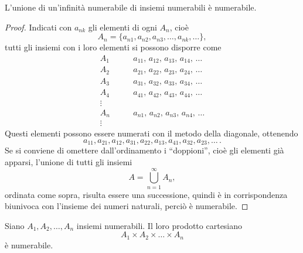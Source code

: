 \begin{teorema}
\label{t:unione_num}
L'unione di un'infinità numerabile di insiemi numerabili è numerabile.
\end{teorema}
\begin{proof}
Indicati con $a_{nk}$ gli elementi di ogni $A_n$, cioè
\[
A_n=\{a_{n1},a_{n2},a_{n3},\dots,a_{nk},\dots\},
\]
tutti gli insiemi con i loro elementi si possono disporre come
\begin{align*}
A_1\qquad &a_{11},\,a_{12},\,a_{13},\,a_{14},\,\dots\\
A_2\qquad &a_{21},\,a_{22},\,a_{23},\,a_{24},\,\dots\\
A_3\qquad &a_{31},\,a_{32},\,a_{33},\,a_{34},\,\dots\\
A_4\qquad &a_{41},\,a_{42},\,a_{43},\,a_{44},\,\dots\\
\vdots\\
A_n\qquad &a_{n1},\,a_{n2},\,a_{n3},\,a_{n4},\,\dots\\
\vdots
\end{align*}
Questi elementi possono essere numerati con il metodo della diagonale, ottenendo
\[
a_{11},a_{21},a_{12},a_{31},a_{22},a_{13},a_{41},a_{32},a_{23},\dots\,.
\]
Se si conviene di omettere dall'ordinamento i ``doppioni'', cioè gli elementi già apparsi, l'unione di tutti gli insiemi
\[
A=\bigcup_{n=1}^{\infty}A_n,
\]
ordinata come sopra, risulta essere una successione, quindi è in corrispondenza biunivoca con l'insieme dei numeri naturali, perciò è numerabile.
\end{proof}
\begin{teorema}
\label{t:prod_cart_numerabile}
Siano $A_1,A_2,\dots,A_n$ insiemi numerabili. Il loro prodotto cartesiano
\[
A_1\times A_2\times\dots\times A_n
\]
è numerabile.
\end{teorema}
